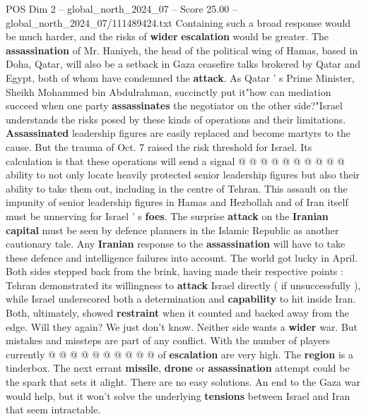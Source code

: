 \begin{textsample}{POS Dim 2 – global\_north\_2024\_07 – Score 25.00 – global\_north\_2024\_07/111489424.txt}
Containing such a broad response would be much harder, and the risks of \textbf{wider} \textbf{escalation} would be greater.
The \textbf{assassination} of Mr.
Haniyeh, the head of the political wing of Hamas, based in Doha, Qatar, will also be a setback in Gaza ceasefire talks brokered by Qatar and Egypt, both of whom have condemned the \textbf{attack}.
As Qatar ' s Prime Minister, Sheikh Mohammed bin Abdulrahman, succinctly put it"how can mediation succeed when one party \textbf{assassinates} the negotiator on the other side?"Israel understands the risks posed by these kinds of operations and their limitations. \textbf{Assassinated} leadership figures are easily replaced and become martyrs to the cause.
But the trauma of Oct. 7 raised the risk threshold for Israel.
Its calculation is that these operations will send a signal @ @ @ @ @ @ @ @ @ @ ability to not only locate heavily protected senior leadership figures but also their ability to take them out, including in the centre of Tehran.
This assault on the impunity of senior leadership figures in Hamas and Hezbollah and of Iran itself must be unnerving for Israel ' s \textbf{foes}.
The surprise \textbf{attack} on the \textbf{Iranian} \textbf{capital} must be seen by defence planners in the Islamic Republic as another cautionary tale.
Any \textbf{Iranian} response to the \textbf{assassination} will have to take these defence and intelligence failures into account.
The world got lucky in April.
Both sides stepped back from the brink, having made their respective points : Tehran demonstrated its willingness to \textbf{attack} Israel directly ( if unsuccessfully ), while Israel underscored both a determination and \textbf{capability} to hit inside Iran.
Both, ultimately, showed \textbf{restraint} when it counted and backed away from the edge.
Will they again?
We just don't know.
Neither side wants a \textbf{wider} war.
But mistakes and missteps are part of any conflict.
With the number of players currently @ @ @ @ @ @ @ @ @ @ of \textbf{escalation} are very high.
The \textbf{region} is a tinderbox.
The next errant \textbf{missile}, \textbf{drone} or \textbf{assassination} attempt could be the spark that sets it alight.
There are no easy solutions.
An end to the Gaza war would help, but it won't solve the underlying \textbf{tensions} between Israel and Iran that seem intractable.

\end{textsample}
